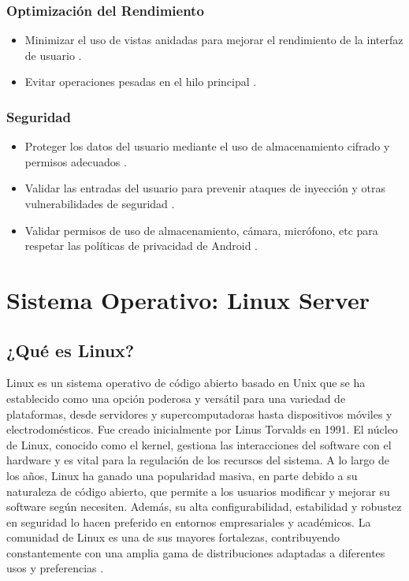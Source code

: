 \subsubsection{Optimización del Rendimiento}
\begin{itemize}
    \item Minimizar el uso de vistas anidadas para mejorar el rendimiento de la interfaz de usuario \cite{PhillipsStewart2022}.
    \item Evitar operaciones pesadas en el hilo principal \cite{PhillipsStewart2022}.
\end{itemize}

\subsubsection{Seguridad}
\begin{itemize}
    \item Proteger los datos del usuario mediante el uso de almacenamiento cifrado y permisos adecuados \cite{PhillipsStewart2022}.
    \item Validar las entradas del usuario para prevenir ataques de inyección y otras vulnerabilidades de seguridad \cite{PhillipsStewart2022}.
    \item Validar permisos de uso de almacenamiento, cámara, micrófono, etc para respetar las políticas de privacidad de Android \cite{PhillipsStewart2022}.
\end{itemize}





\section{Sistema Operativo: Linux Server}

\subsection{¿Qué es Linux?}
Linux es un sistema operativo de código abierto basado en Unix que se ha establecido como una opción poderosa y versátil para una variedad de plataformas, desde servidores y supercomputadoras hasta dispositivos móviles y electrodomésticos. Fue creado inicialmente por Linus Torvalds en 1991. El núcleo de Linux, conocido como el kernel, gestiona las interacciones del software con el hardware y es vital para la regulación de los recursos del sistema. A lo largo de los años, Linux ha ganado una popularidad masiva, en parte debido a su naturaleza de código abierto, que permite a los usuarios modificar y mejorar su software según necesiten. Además, su alta configurabilidad, estabilidad y robustez en seguridad lo hacen preferido en entornos empresariales y académicos. La comunidad de Linux es una de sus mayores fortalezas, contribuyendo constantemente con una amplia gama de distribuciones adaptadas a diferentes usos y preferencias \cite{Linux}.

